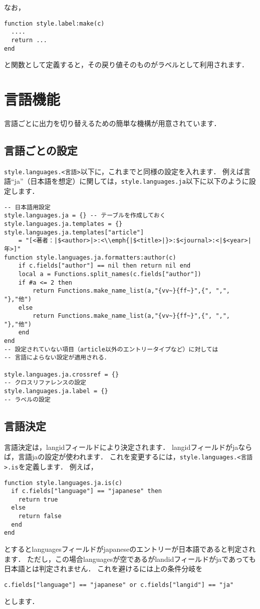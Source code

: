 \documentclass[a4paper,lualatex]{jlreq}
\newcommand*{\luavar}[1]{\texttt{#1}}
\begin{document}
なお，
\begin{lstlisting}
function style.label:make(c)
  ....
  return ...
end
\end{lstlisting}
と関数として定義すると，その戻り値そのものがラベルとして利用されます．


\section{言語機能}
言語ごとに出力を切り替えるための簡単な機構が用意されています．
\subsection{言語ごとの設定}
\luavar{style.languages.<言語>}以下に，これまでと同様の設定を入れます．
例えば言語``ja''（日本語を想定）に関しては，\luavar{style.languages.ja}以下に以下のように設定します．
\begin{lstlisting}
-- 日本語用設定
style.languages.ja = {} -- テーブルを作成しておく
style.languages.ja.templates = {}
style.languages.ja.templates["article"]
    = "[<著者：|$<author>|>:<\\emph{|$<title>|}>:$<journal>:<|$<year>|年>]"
function style.languages.ja.formatters:author(c)
	if c.fields["author"] == nil then return nil end
	local a = Functions.split_names(c.fields["author"])
	if #a <= 2 then
		return Functions.make_name_list(a,"{vv~}{ff~}",{", ",", "},"他")
	else
		return Functions.make_name_list(a,"{vv~}{ff~}",{", ",", "},"他")
	end
end
-- 設定されていない項目（article以外のエントリータイプなど）に対しては
-- 言語によらない設定が適用される．

style.languages.ja.crossref = {}
-- クロスリファレンスの設定
style.languages.ja.label = {}
-- ラベルの設定
\end{lstlisting}

\subsection{言語決定}
言語決定は，langidフィールドにより決定されます．
langidフィールドがjaならば，言語jaの設定が使われます．
これを変更するには，\luavar{style.languages.<言語>.is}を定義します．
例えば，
\begin{lstlisting}
function style.languages.ja.is(c)
  if c.fields["language"] == "japanese" then 
    return true
  else
    return false
  end
end
\end{lstlisting}
とするとlanguagesフィールドがjapaneseのエントリーが日本語であると判定されます．
ただし，この場合languagesが空であるがlandidフィールドがjaであっても日本語とは判定されません．
これを避けるには上の条件分岐を
\begin{lstlisting}
c.fields["language"] == "japanese" or c.fields["langid"] == "ja"
\end{lstlisting}
とします．
\end{document}
